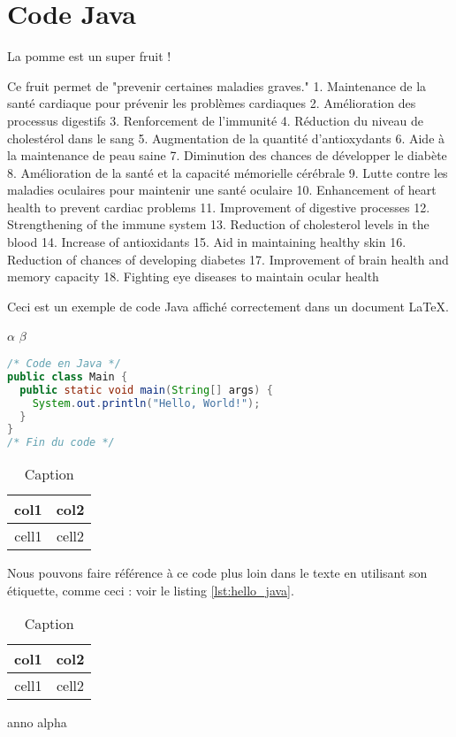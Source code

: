 \documentclass{article}
\begin{document}
\section{Code Java}

La pomme est un super fruit !

Ce fruit permet de "prevenir certaines maladies graves."
1. Maintenance de la santé cardiaque pour prévenir les problèmes cardiaques
2. Amélioration des processus digestifs
3. Renforcement de l'immunité
4. Réduction du niveau de cholestérol dans le sang
5. Augmentation de la quantité d'antioxydants
6. Aide à la maintenance de peau saine
7. Diminution des chances de développer le diabète
8. Amélioration de la santé et la capacité mémorielle cérébrale
9. Lutte contre les maladies oculaires pour maintenir une santé oculaire
10. Enhancement of heart health to prevent cardiac problems
11. Improvement of digestive processes
12. Strengthening of the immune system
13. Reduction of cholesterol levels in the blood
14. Increase of antioxidants
15. Aid in maintaining healthy skin
16. Reduction of chances of developing diabetes
17. Improvement of brain health and memory capacity
18. Fighting eye diseases to maintain ocular health











Ceci est un exemple de code Java affiché correctement dans un document LaTeX.

$\alpha$
$\beta$

\begin{lstlisting}[language=Java, caption={Exemple "Hello, World!" en Java.}, label={lst:hello_java}]
/* Code en Java */
public class Main {
  public static void main(String[] args) {
    System.out.println("Hello, World!");
  }
}
/* Fin du code */
\end{lstlisting}

\begin{table}[h!]
    \centering
    \begin{tabular}{|c|c|}
        \hline
        col1 & col2 \\
        \hline
        cell1 & cell2 \\
        \hline
    \end{tabular}
    \caption{Caption}
    \label{tab:my_label}
\end{table}

Nous pouvons faire référence à ce code plus loin dans le texte en utilisant son étiquette, comme ceci : voir le listing \ref{lst:hello_java}.


\begin{table}[h!]
    \centering
    \begin{tabular}{|c|c|}
        \hline
        col1 & col2 \\
        \hline
        cell1 & cell2 \\
        \hline
    \end{tabular}
    \caption{Caption}
    \label{tab:my_label}
\end{table}

anno	
alpha 		
\end{document}
